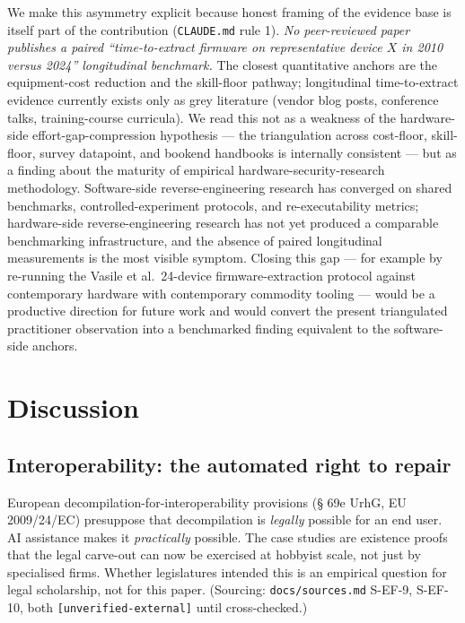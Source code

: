 \documentclass[11pt,a4paper]{article}
\begin{document}
We make this asymmetry explicit because honest framing of the evidence
base is itself part of the contribution (\texttt{CLAUDE.md} rule 1).
\emph{No peer-reviewed paper publishes a paired ``time-to-extract
firmware on representative device $X$ in 2010 versus 2024''
longitudinal benchmark.} The closest quantitative anchors are the
equipment-cost reduction and the skill-floor pathway; longitudinal
time-to-extract evidence currently exists only as grey literature
(vendor blog posts, conference talks, training-course curricula). We
read this not as a weakness of the hardware-side effort-gap-compression
hypothesis --- the triangulation across cost-floor, skill-floor, survey
datapoint, and bookend handbooks is internally consistent --- but as a
finding about the maturity of empirical hardware-security-research
methodology. Software-side reverse-engineering research has converged
on shared benchmarks, controlled-experiment protocols, and
re-executability metrics; hardware-side reverse-engineering research
has not yet produced a comparable benchmarking infrastructure, and the
absence of paired longitudinal measurements is the most visible
symptom. Closing this gap --- for example by re-running the Vasile et
al.\ 24-device firmware-extraction protocol against contemporary
hardware with contemporary commodity tooling --- would be a productive
direction for future work and would convert the present triangulated
practitioner observation into a benchmarked finding equivalent to the
software-side anchors.

\section{Discussion}
\label{sec:discussion}

\subsection{Interoperability: the automated right to repair}
\label{sec:disc-r2r}
European decompilation-for-interoperability provisions
(\S{} 69e UrhG, EU 2009/24/EC) presuppose that decompilation is
\emph{legally} possible for an end user. AI assistance makes it
\emph{practically} possible. The case studies are existence proofs that the
legal carve-out can now be exercised at hobbyist scale, not just by
specialised firms. Whether legislatures intended this is an empirical
question for legal scholarship, not for this paper. (Sourcing:
\texttt{docs/sources.md} S-EF-9, S-EF-10, both
\texttt{[unverified-external]} until cross-checked.)
\end{document}
